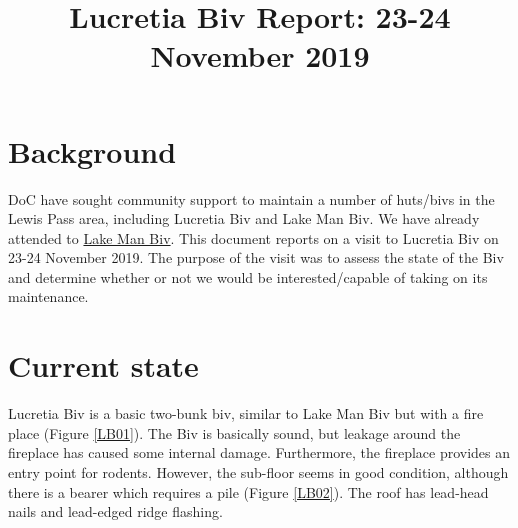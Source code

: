 \documentclass[12pt]{article} %
\title{Lucretia Biv Report: 23-24 November 2019}
\makeatletter
\renewcommand{\maketitle}{%
  {\bfseries{\scshape{\Large{\@title\par}}}}
}
\makeatother
\begin{document}
  \maketitle

\section{Background}

DoC have sought community support to maintain a number of huts/bivs in the Lewis Pass area, including Lucretia Biv and Lake Man Biv.  We have already attended to \href{https://drive.google.com/open?id=1DdW8LlDO5h38anP1OH9vCVlA9F1gLeeN}{Lake Man Biv}.  This document reports on a visit to Lucretia Biv on 23-24 November 2019.  The purpose of the visit was to assess the state of the Biv and determine whether or not we would be interested/capable of taking on its maintenance.

\section{Current state}

Lucretia Biv is a basic two-bunk biv, similar to Lake Man Biv but with a fire place (Figure \ref{LB01}).  The Biv is basically sound, but leakage around the fireplace has caused some internal damage.  Furthermore, the fireplace provides an entry point for rodents.  However, the sub-floor seems in good condition, although there is a bearer which requires a pile (Figure \ref{LB02}).  The roof has lead-head nails and lead-edged ridge flashing.
\end{document}

